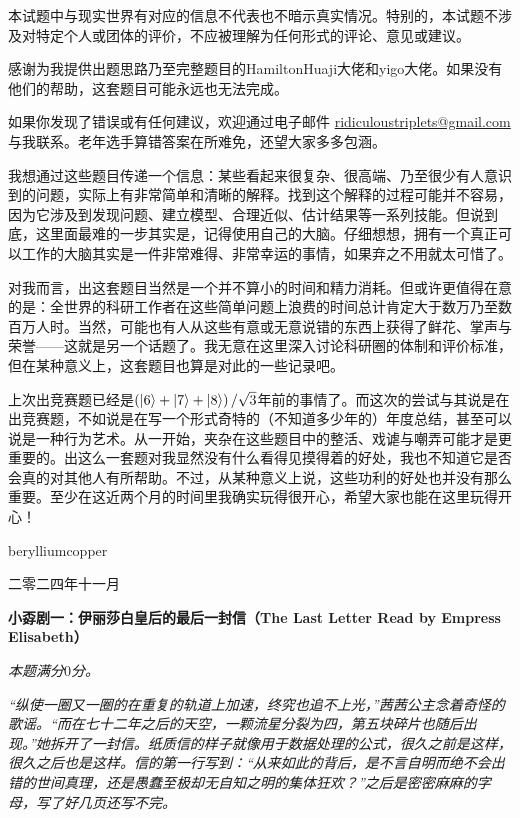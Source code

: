 \documentclass[11pt,a4paper,onecolumn,UTF8]{ctexart}
\begin{document}
	本试题中与现实世界有对应的信息不代表也不暗示真实情况。特别的，本试题不涉及对特定个人或团体的评价，不应被理解为任何形式的评论、意见或建议。
	
	感谢为我提供出题思路乃至完整题目的HamiltonHuaji大佬和yigo大佬。如果没有他们的帮助，这套题目可能永远也无法完成。
	
	如果你发现了错误或有任何建议，欢迎通过电子邮件 \href{mailto:ridiculoustriplets@gmail.com}{ridiculoustriplets@gmail.com} 与我联系。老年选手算错答案在所难免，还望大家多多包涵。
	
	我想通过这些题目传递一个信息：某些看起来很复杂、很高端、乃至很少有人意识到的问题，实际上有非常简单和清晰的解释。找到这个解释的过程可能并不容易，因为它涉及到发现问题、建立模型、合理近似、估计结果等一系列技能。但说到底，这里面最难的一步其实是，记得使用自己的大脑。仔细想想，拥有一个真正可以工作的大脑其实是一件非常难得、非常幸运的事情，如果弃之不用就太可惜了。
	
	对我而言，出这套题目当然是一个并不算小的时间和精力消耗。但或许更值得在意的是：全世界的科研工作者在这些简单问题上浪费的时间总计肯定大于数万乃至数百万人时。当然，可能也有人从这些有意或无意说错的东西上获得了鲜花、掌声与荣誉——这就是另一个话题了。我无意在这里深入讨论科研圈的体制和评价标准，但在某种意义上，这套题目也算是对此的一些记录吧。
	
	上次出竞赛题已经是$\left(\ket{6}+\ket{7}+\ket{8}\right)/\sqrt{3}$年前的事情了。而这次的尝试与其说是在出竞赛题，不如说是在写一个形式奇特的（不知道多少年的）年度总结，甚至可以说是一种行为艺术。从一开始，夹杂在这些题目中的整活、戏谑与嘲弄可能才是更重要的。出这么一套题对我显然没有什么看得见摸得着的好处，我也不知道它是否会真的对其他人有所帮助。不过，从某种意义上说，这些功利的好处也并没有那么重要。至少在这近两个月的时间里我确实玩得很开心，希望大家也能在这里玩得开心！
	
	\begin{flushright}
		berylliumcopper
		
		二零二四年十一月
	\end{flushright}
	

	
	
	\newpage
	\noindent
	\textbf{小孬剧一：伊丽莎白皇后的最后一封信（The Last Letter Read by Empress Elisabeth）}
	
	\textit{本题满分$0$分。}
	
	\textit{“纵使一圈又一圈的在重复的轨道上加速，终究也追不上光，”茜茜公主念着奇怪的歌谣。\faMapMarker“而在七十二年之后的天空，一颗流星分裂为四，第五块碎片也随后出现。”她拆开了一封信。纸质信的样子就像用于数据处理的公式，很久之前是这样，很久之后也是这样。信的第一行写到：“从来如此的背后，是不言自明而绝不会出错的世间真理，还是愚蠢至极却无自知之明的集体狂欢？”之后是密密麻麻的字母，写了好几页还写不完。}
	
\end{document}
